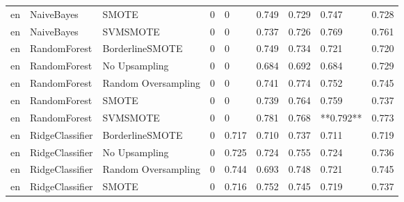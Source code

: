 \begin{tabular}{lllllllll}
      en &                   NaiveBayes &               SMOTE &     0 &                         0 &                 0.749 &                  0.729 &                                   0.747 &     0.728 \\
      en &                   NaiveBayes &            SVMSMOTE &     0 &                         0 &                 0.737 &                  0.726 &                                   0.769 &     0.761 \\
      en &                 RandomForest &     BorderlineSMOTE &     0 &                         0 &                 0.749 &                  0.734 &                                   0.721 &     0.720 \\
      en &                 RandomForest &       No Upsampling &     0 &                         0 &                 0.684 &                  0.692 &                                   0.684 &     0.729 \\
      en &                 RandomForest & Random Oversampling &     0 &                         0 &                 0.741 &                  0.774 &                                   0.752 &     0.745 \\
      en &                 RandomForest &               SMOTE &     0 &                         0 &                 0.739 &                  0.764 &                                   0.759 &     0.737 \\
      en &                 RandomForest &            SVMSMOTE &     0 &                         0 &                 0.781 &                  0.768 &                               **0.792** &     0.773 \\
      en &              RidgeClassifier &     BorderlineSMOTE &     0 &                     0.717 &                 0.710 &                  0.737 &                                   0.711 &     0.719 \\
      en &              RidgeClassifier &       No Upsampling &     0 &                     0.725 &                 0.724 &                  0.755 &                                   0.724 &     0.736 \\
      en &              RidgeClassifier & Random Oversampling &     0 &                     0.744 &                 0.693 &                  0.748 &                                   0.721 &     0.745 \\
      en &              RidgeClassifier &               SMOTE &     0 &                     0.716 &                 0.752 &                  0.745 &                                   0.719 &     0.737 \\

\end{tabular}
